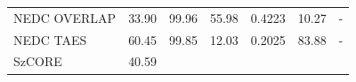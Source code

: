 \documentclass[
  10pt,
]{article}
\begin{document}
\begin{longtable}[]{@{}lllllll@{}}
\begin{minipage}[t]{0.12\columnwidth}\raggedright
NEDC OVERLAP\strut
\end{minipage} & \begin{minipage}[t]{0.12\columnwidth}\raggedright
33.90\strut
\end{minipage} & \begin{minipage}[t]{0.12\columnwidth}\raggedright
99.96\strut
\end{minipage} & \begin{minipage}[t]{0.12\columnwidth}\raggedright
55.98\strut
\end{minipage} & \begin{minipage}[t]{0.12\columnwidth}\raggedright
0.4223\strut
\end{minipage} & \begin{minipage}[t]{0.12\columnwidth}\raggedright
10.27\strut
\end{minipage} & \begin{minipage}[t]{0.12\columnwidth}\raggedright
-\strut
\end{minipage}\tabularnewline
\begin{minipage}[t]{0.12\columnwidth}\raggedright
NEDC TAES\strut
\end{minipage} & \begin{minipage}[t]{0.12\columnwidth}\raggedright
60.45\strut
\end{minipage} & \begin{minipage}[t]{0.12\columnwidth}\raggedright
99.85\strut
\end{minipage} & \begin{minipage}[t]{0.12\columnwidth}\raggedright
12.03\strut
\end{minipage} & \begin{minipage}[t]{0.12\columnwidth}\raggedright
0.2025\strut
\end{minipage} & \begin{minipage}[t]{0.12\columnwidth}\raggedright
83.88\strut
\end{minipage} & \begin{minipage}[t]{0.12\columnwidth}\raggedright
-\strut
\end{minipage}\tabularnewline
\begin{minipage}[t]{0.12\columnwidth}\raggedright
SzCORE\strut
\end{minipage} & \begin{minipage}[t]{0.12\columnwidth}\raggedright
40.59\strut
\end{minipage} & \begin{minipage}[t]{0.12\columnwidth}\raggedright

\end{minipage}
\end{longtable}
\end{document}
